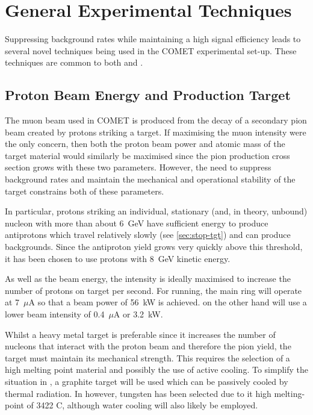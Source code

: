 \section{General Experimental Techniques}
Suppressing background rates while maintaining a high signal efficiency leads to several novel techniques being used in the COMET experimental set-up.
These techniques are common to both \phaseI and \phaseII.

\subsection{Proton Beam Energy and Production Target}
The muon beam used in COMET is produced from the decay of a secondary pion beam created by protons striking a target.
If maximising the muon intensity were the only concern, then both the proton beam power and atomic mass of the target material would similarly be maximised since the pion production cross section
grows with these two parameters.
However, the need to suppress background rates and maintain the mechanical and operational stability of the target constrains both of these parameters.

In particular, protons striking an individual, stationary (and, in theory, unbound) nucleon with more than about 6~GeV have sufficient energy to produce antiprotons which travel relatively slowly (see \ref{sec:stop-tgt}) and can produce backgrounds.
Since the antiproton yield grows very quickly above this threshold, it has been chosen to use protons with 8~GeV kinetic energy.

As well as the beam energy, the intensity is ideally maximised to increase the number of protons on target per second.
For \phaseII running, the main ring will operate at 7~$\mu$A so that a beam power of 56~kW is achieved.  
\phaseI on the other hand will use a lower beam intensity of 0.4~$\mu$A or 3.2~kW.

Whilst a heavy metal target is preferable since it increases the number of nucleons that interact with the proton beam and therefore the pion yield,
the target must maintain its mechanical strength.
This requires the selection of a high melting point material and possibly the use of active cooling.
To simplify the situation in \phaseI, a graphite target will be used which can be passively cooled by thermal radiation.
In \phaseII however, tungsten has been selected due to it high melting-point of 3422 C, although water cooling will also likely be employed.

\FigPionSpectraVsAngle

